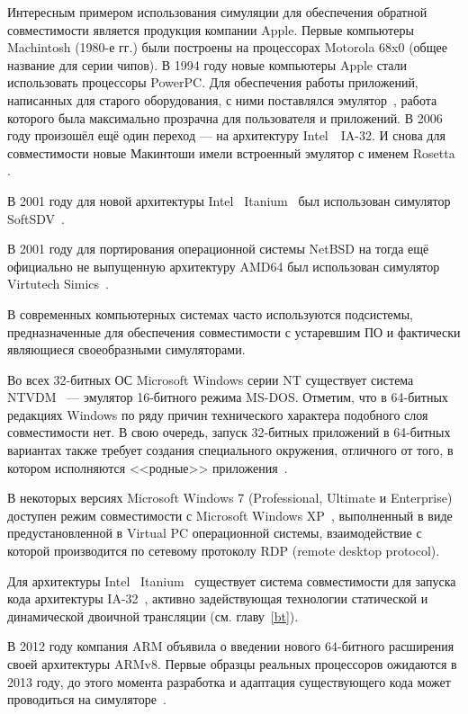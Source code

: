\begin{itemize*}

\item Интересным примером использования симуляции для обеспечения обратной совместимости является продукция компании Apple.  Первые компьютеры Machintosh (1980-е гг.) были построены на процессорах Motorola 68x0 (общее название для серии чипов). В 1994 году новые компьютеры Apple стали использовать процессоры PowerPC. Для обеспечения работы приложений, написанных для старого оборудования, с ними поставлялся эмулятор~\cite{apple-ppcsoftware}, работа которого была максимально прозрачна для пользователя и приложений. В 2006 году произошёл ещё один переход --- на архитектуру Intel\textregistered~~IA-32. И снова для совместимости новые Макинтоши имели встроенный эмулятор с именем Rosetta \cite{apple-rosetta, macosx-internals}.

\item В 2001 году для новой архитектуры Intel\textregistered~ Itanium\texttrademark~ был использован симулятор SoftSDV~\cite{softsdv-ia64}.

\item В 2001 году для портирования операционной системы NetBSD на тогда ещё официально не выпущенную архитектуру AMD64 был использован симулятор Virtutech Simics~\cite{netbsd-amd64}.

\item В современных компьютерных системах часто используются подсистемы, предназначенные для обеспечения совместимости с устаревшим ПО и фактически являющиеся своеобразными симуляторами.

\item Во всех 32-битных ОС Microsoft Windows серии NT существует система NTVDM~\cite{ntvdm} --- эмулятор 16-битного режима MS-DOS. Отметим, что в 64-битных редакциях Windows по ряду причин технического характера подобного слоя совместимости нет. В свою очередь, запуск 32-битных приложений в 64-битных вариантах также требует создания специального окружения, отличного от того, в котором исполняются <<родные>> приложения~\cite[глава 3]{wininternals6-pt1}.

\item В некоторых версиях Microsoft Windows 7 (Professional, Ultimate и Enterprise) доступен режим совместимости с Microsoft Windows XP~\cite{winxp-mode}, выполненный в виде предустановленной в Virtual PC операционной системы, взаимодействие с которой производится по сетевому протоколу RDP (\abbr remote desktop protocol).

\item Для архитектуры Intel\textregistered~ Itanium\texttrademark~ существует система совместимости для запуска кода архитектуры IA-32~\cite{Baraz03ia-32execution}, активно задействующая технологии статической и динамической двоичной трансляции (см. главу~\ref{bt}).

\item В 2012 году компания ARM объявила о введении нового 64-битного расширения своей архитектуры ARMv8. Первые образцы реальных процессоров ожидаются в 2013 году, до этого момента разработка и адаптация существующего кода может проводиться на симуляторе~\cite{armv8}.
\end{itemize*}

